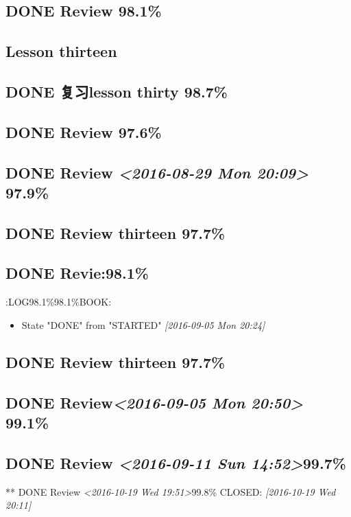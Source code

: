 \documentclass[11pt]{ctexart}
\begin{document}
\subsection{{\bfseries\sffamily DONE} Review 98.1\%}
\label{sec:orga2cbbf4}

\subsection{Lesson thirteen}
\label{sec:org703ccd3}
\subsection{{\bfseries\sffamily DONE} 复习lesson thirty 98.7\%}
\label{sec:org14542a3}
\subsection{{\bfseries\sffamily DONE} Review 97.6\%}
\label{sec:orga05af72}
\subsection{{\bfseries\sffamily DONE} Review \textit{<2016-08-29 Mon 20:09> } 97.9\%}
\label{sec:org6d10122}
\subsection{{\bfseries\sffamily DONE} Review thirteen 97.7\%}
\label{sec:org328616a}
\subsection{{\bfseries\sffamily DONE} Revie:98.1\%}
\label{sec:orgc992f0c}
:LOG98.1\%98.1\%BOOK:
\begin{itemize}
\item State "DONE"       from "STARTED"    \textit{[2016-09-05 Mon 20:24]}
\end{itemize}
\subsection{{\bfseries\sffamily DONE} Review thirteen 97.7\%}
\label{sec:orgd9a02a5}

\subsection{{\bfseries\sffamily DONE} Review\textit{<2016-09-05 Mon 20:50> } 99.1\%}
\label{sec:org6fc61a1}
\subsection{{\bfseries\sffamily DONE} Review \textit{<2016-09-11 Sun 14:52>}99.7\%}
\label{sec:org613ee64}
** DONE Review \textit{<2016-10-19 Wed 19:51>}99.8\%
  CLOSED: \textit{[2016-10-19 Wed 20:11]}
\end{document}
